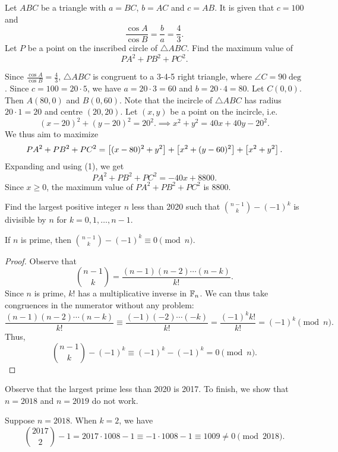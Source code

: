 \begin{question}[8800]\label{A::2020-O-1-17}
    Let $ABC$ be a triangle with $a = BC$, $b = AC$ and $c = AB$. It is given that $c = 100$ and \[\frac{\cos A}{\cos B} = \frac{b}{a} = \frac43.\] Let $P$ be a point on the inscribed circle of $\triangle ABC$. Find the maximum value of \[PA^2 + PB^2 + PC^2.\]
\end{question}

Since $\frac{\cos A}{\cos B} = \frac43$, $\triangle ABC$ is congruent to a 3-4-5 right triangle, where $\angle C = 90\deg$. Since $c = 100 = 20 \cdot 5$, we have $a = 20 \cdot 3 = 60$ and $b = 20 \cdot 4 = 80$. Let $C(0,0)$. Then $A(80, 0)$ and $B(0, 60)$. Note that the incircle of $\triangle ABC$ has radius $20 \cdot 1 = 20$ and centre $(20, 20)$. Let $(x, y)$ be a point on the incircle, i.e. \[(x-20)^2 + (y-20)^2 = 20^2.\implies x^2 + y^2 = 40x + 40y - 20^2 \tag{1}.\] We thus aim to maximize \[PA^2 + PB^2 + PC^2 = \left[ (x-80)^2 + y^2 \right] + \left[ x^2 + (y-60)^2 \right] + \left[ x^2 + y^2 \right].\] Expanding and using (1), we get \[PA^2 + PB^2 + PC^2 = -40x + 8800.\] Since $x \geq 0$, the maximum value of $PA^2 + PB^2 + PC^2$ is 8800.

\begin{question}[2017]\label{A::2020-O-1-18}
    Find the largest positive integer $n$ less than 2020 such that $\binom{n-1}{k} - (-1)^k$ is divisible by $n$ for $k = 0, 1, \ldots, n-1$.
\end{question}

\begin{claim}{1}
    If $n$ is prime, then $\binom{n-1}{k} - (-1)^k \equiv 0 \pmod{n}$.
\end{claim}
\begin{proof}
    Observe that \[\binom{n-1}{k} = \frac{(n-1)(n-2)\cdots(n-k)}{k!}.\] Since $n$ is prime, $k!$ has a multiplicative inverse in $\mathbb{F}_n$. We can thus take congruences in the numerator without any problem: \[\frac{(n-1)(n-2)\cdots(n-k)}{k!} \equiv \frac{(-1)(-2)\cdots(-k)}{k!} = \frac{(-1)^k k!}{k!} = (-1)^k \pmod{n}.\] Thus, \[\binom{n-1}{k} - (-1)^k \equiv (-1)^k - (-1)^k = 0 \pmod{n}.\]
\end{proof}

Observe that the largest prime less than 2020 is 2017. To finish, we show that $n = 2018$ and $n = 2019$ do not work.

 Suppose $n = 2018$. When $k = 2$, we have \[\binom{2017}{2} - 1 = 2017 \cdot 1008 - 1 \equiv -1 \cdot 1008 - 1 \equiv 1009 \neq 0 \pmod{2018}.\]

